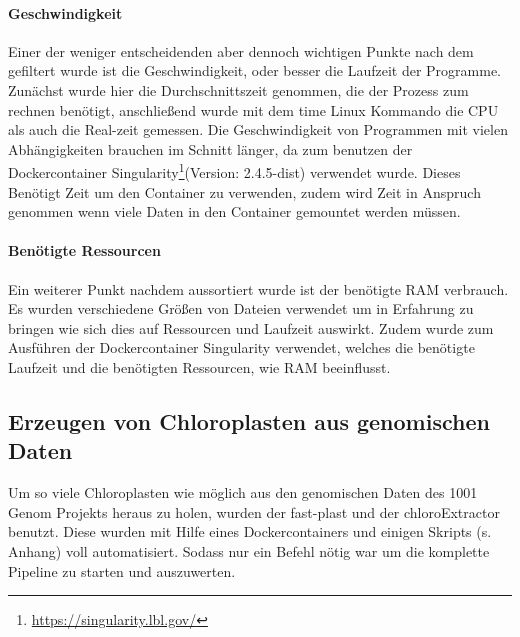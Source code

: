 \documentclass{scrartcl}
\begin{document}
\paragraph{Geschwindigkeit}
\label{sec-3-1-2-3}
Einer der weniger entscheidenden aber dennoch wichtigen Punkte nach dem gefiltert wurde ist die Geschwindigkeit, 
oder besser die Laufzeit der Programme. Zunächst wurde hier die Durchschnittszeit genommen, die der Prozess zum rechnen benötigt,
anschließend wurde mit dem time Linux Kommando die CPU als auch die Real-zeit gemessen. Die Geschwindigkeit von Programmen mit vielen Abhängigkeiten 
brauchen im Schnitt länger, da zum benutzen der Dockercontainer Singularity\footnote{\url{https://singularity.lbl.gov/}}(Version: 2.4.5-dist) verwendet wurde. Dieses Benötigt Zeit um den Container zu verwenden,
zudem wird Zeit in Anspruch genommen wenn viele Daten in den Container gemountet werden müssen.
\paragraph{Benötigte Ressourcen}
\label{sec-3-1-2-4}
Ein weiterer Punkt nachdem aussortiert wurde ist der benötigte RAM verbrauch. Es wurden verschiedene Größen von Dateien verwendet
um in Erfahrung zu bringen wie sich dies auf Ressourcen und Laufzeit auswirkt. Zudem wurde zum Ausführen der Dockercontainer 
Singularity \footnotemark[49]{} verwendet, welches die benötigte Laufzeit und die benötigten Ressourcen, wie RAM beeinflusst.


\subsection{Erzeugen von Chloroplasten aus genomischen Daten}
\label{sec-3-2}
Um so viele Chloroplasten wie möglich aus den genomischen Daten des 1001 Genom Projekts heraus zu holen, wurden der fast-plast und der chloroExtractor benutzt.
Diese wurden mit Hilfe eines Dockercontainers und einigen Skripts (s. Anhang) voll automatisiert. Sodass nur ein Befehl nötig war um die komplette 
Pipeline zu starten und auszuwerten. 
\end{document}
